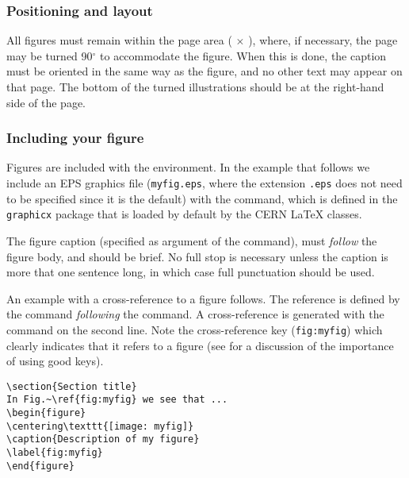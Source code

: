 \documentclass{cernyrep}
\begin{document}
\subsubsection{Positioning and layout}

All figures must remain within the page area ( $\times$
), where, if necessary, the page may be turned 90$^\circ$
to accommodate the figure. When this is done, the caption must be
oriented in the same way as the figure, and no other text may appear
on that page.  The bottom of the turned illustrations should be at the
right-hand side of the page.

\subsubsection{Including your figure}

Figures are included with the  environment. In the
example that follows we include an EPS graphics file
(\texttt{myfig.eps}, where the extension \texttt{.eps} does not need
to be specified since it is the default) with the
 command, which is defined in the
\texttt{graphicx} package that is loaded by default by the CERN
\LaTeX{} classes.

The figure caption (specified as argument of the 
command), must \emph{follow} the figure body, and should be brief. No
full stop is necessary unless the caption is more that one sentence
long, in which case full punctuation should be used.


An example with a cross-reference to a figure follows. The reference
is defined by the  command \emph{following} the
 command. A cross-reference is generated with the
 command on the second line. Note the cross-reference key
(\texttt{fig:myfig}) which clearly indicates that it refers to a
figure (see  for a discussion of the importance of
using good keys).
\begin{verbatim}
\section{Section title}
In Fig.~\ref{fig:myfig} we see that ...
\begin{figure}
\centering\texttt{[image: myfig]}
\caption{Description of my figure}
\label{fig:myfig}
\end{figure}
\end{verbatim}
\end{document}
